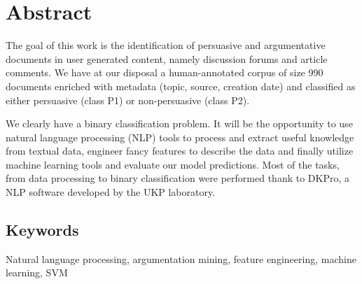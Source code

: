 \section*{Abstract}
The goal of this work is the identification of persuasive and argumentative documents in user generated content, namely discussion forums and article comments. We have at our disposal a human-annotated corpus of size 990 documents enriched with metadata (topic, source, creation date) and classified as either persuasive (class P1) or non-persuasive (class P2).

We clearly have a binary classification problem. It will be the opportunity to use natural language processing (NLP) tools to process and extract useful knowledge from textual data, engineer fancy features to describe the data and finally utilize machine learning tools and evaluate our model predictions. Most of the tasks, from data processing to binary classification were performed thank to DKPro, a NLP software developed by the UKP laboratory. 

\subsection*{Keywords}

Natural language processing, argumentation mining, feature engineering, machine learning, SVM